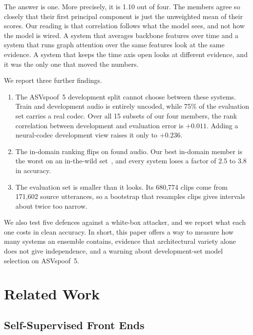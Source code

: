 \documentclass[twocolumn,a4paper,11pt]{article}
\begin{document}
The answer is one. More precisely, it is 1.10 out of four. The members agree so
closely that their first principal component is just the unweighted mean of
their scores. Our reading is that correlation follows what the model
sees, and not how the model is wired. A system that averages backbone features
over time and a system that runs graph attention over the same features look
at the same evidence. A system that keeps the time axis open looks at
different evidence, and it was the only one that moved the numbers.

We report three further findings.
\begin{enumerate}[leftmargin=1.2em,itemsep=2pt]
\item The ASVspoof~5 development split cannot choose between these systems.
  Train and development audio is entirely uncoded, while 75\% of the evaluation
  set carries a real codec. Over all 15 subsets of our four members, the rank
  correlation between development and evaluation error is $+0.011$. Adding a
  neural-codec development view raises it only to $+0.236$.
\item The in-domain ranking flips on found audio. Our best in-domain member is
  the worst on an in-the-wild set~\cite{intothewild}, and every system loses a
  factor of 2.5 to 3.8 in accuracy.
\item The evaluation set is smaller than it looks. Its 680{,}774 clips come
  from 171{,}602 source utterances, so a bootstrap that resamples clips gives
  intervals about twice too narrow.
\end{enumerate}

We also test five defences against a white-box attacker, and we report what
each one costs in clean accuracy. In short, this paper offers a way to measure
how many systems an ensemble contains, evidence that architectural variety
alone does not give independence, and a warning about development-set model
selection on ASVspoof~5.

\section{Related Work}
\label{sec:related}

\subsection{Self-Supervised Front Ends}
\end{document}

